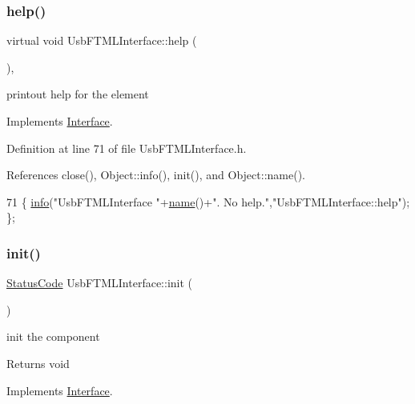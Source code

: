 \subsubsection{\texorpdfstring{help()}{help()}}
{\footnotesize\ttfamily virtual void Usb\+F\+T\+M\+L\+Interface\+::help (\begin{DoxyParamCaption}{ }\end{DoxyParamCaption})\hspace{0.3cm}{\ttfamily [inline]}, {\ttfamily [virtual]}}

printout help for the element 

Implements \hyperlink{classInterface_aedd3cf1d964c837e7848ccf81dc9c760}{Interface}.



Definition at line 71 of file Usb\+F\+T\+M\+L\+Interface.\+h.



References close(), Object\+::info(), init(), and Object\+::name().


\begin{DoxyCode}
71 \{ \hyperlink{classObject_a644fd329ea4cb85f54fa6846484b84a8}{info}(\textcolor{stringliteral}{"UsbFTMLInterface "}+\hyperlink{classObject_a300f4c05dd468c7bb8b3c968868443c1}{name}()+\textcolor{stringliteral}{". No help."},\textcolor{stringliteral}{"UsbFTMLInterface::help"}); \};
\end{DoxyCode}
\mbox{\label{classUsbFTMLInterface_a7f7c96ece97e607b88425823a2923a43}} 
\subsubsection{\texorpdfstring{init()}{init()}}
{\footnotesize\ttfamily \hyperlink{classStatusCode}{Status\+Code} Usb\+F\+T\+M\+L\+Interface\+::init (\begin{DoxyParamCaption}{ }\end{DoxyParamCaption})\hspace{0.3cm}{\ttfamily [virtual]}}

init the component

\begin{DoxyReturn}{Returns}
void 
\end{DoxyReturn}


Implements \hyperlink{classInterface_a1d095c113b1e89d1f5f68323856fee63}{Interface}.



